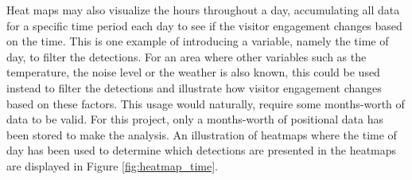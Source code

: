 Heat maps may also visualize the hours throughout a day, accumulating all data for a specific time period each day to see if the visitor engagement changes based on the time. This is one example of introducing a variable, namely the time of day, to filter the detections. For an area where other variables such as the temperature, the noise level or the weather is also known, this could be used instead to filter the detections and illustrate how visitor engagement changes based on these factors. This usage would naturally, require some months-worth of data to be valid. For this project, only a months-worth of positional data has been stored to make the analysis. An illustration of heatmaps where the time of day has been used to determine which detections are presented in the heatmaps are displayed in Figure \ref{fig:heatmap_time}.

